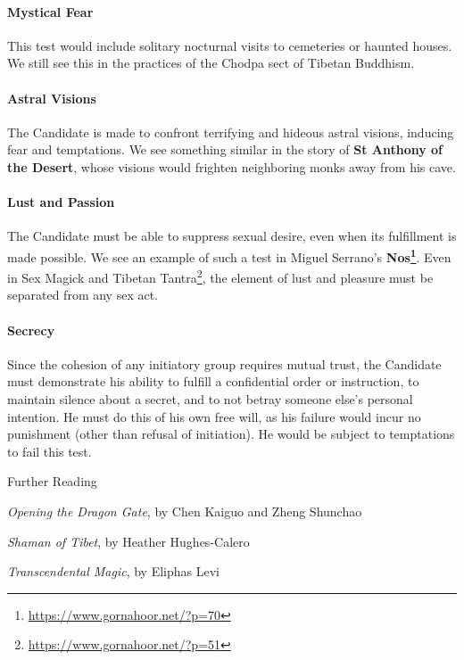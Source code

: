 \paragraph{Mystical Fear}

This test would include solitary nocturnal visits to cemeteries or haunted houses. We still see this in the practices of the Chodpa sect of Tibetan Buddhism.

\paragraph{Astral Visions}

The Candidate is made to confront terrifying and hideous astral visions, inducing fear and temptations. We see something similar in the story of \textbf{St Anthony of the Desert}, whose visions would frighten neighboring monks away from his cave.

\paragraph{Lust and Passion}

The Candidate must be able to suppress sexual desire, even when its fulfillment is made possible. We see an example of such a test in Miguel Serrano's \textbf{Nos\footnote{\url{https://www.gornahoor.net/?p=70}}}. Even in Sex Magick and Tibetan Tantra\footnote{\url{https://www.gornahoor.net/?p=51}}, the element of lust and pleasure must be separated from any sex act.

\paragraph{Secrecy}

Since the cohesion of any initiatory group requires mutual trust, the Candidate must demonstrate his ability to fulfill a confidential order or instruction, to maintain silence about a secret, and to not betray someone else's personal intention. He must do this of his own free will, as his failure would incur no punishment (other than refusal of initiation). He would be subject to temptations to fail this test.

Further Reading

\textit{Opening the Dragon Gate}, by Chen Kaiguo and Zheng Shunchao

\textit{Shaman of Tibet}, by Heather Hughes-Calero

\textit{Transcendental Magic}, by Eliphas Levi

